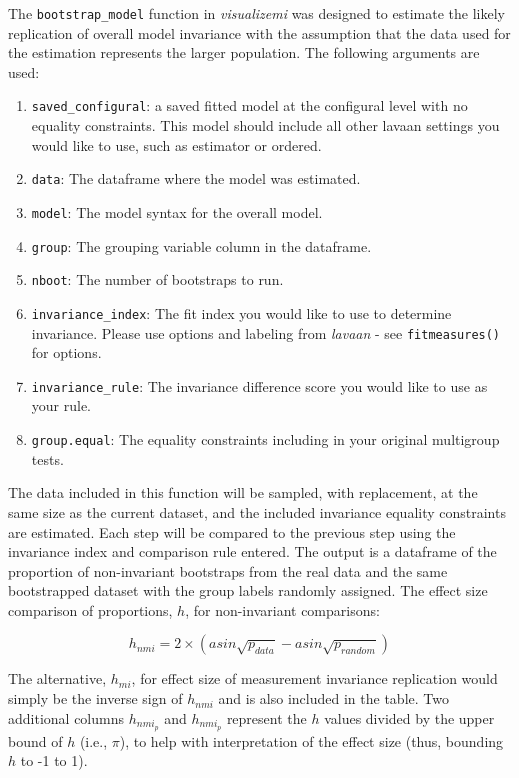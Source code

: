 \documentclass[
  man]{apa7}
\providecommand{\tightlist}{%
  \setlength{\itemsep}{0pt}\setlength{\parskip}{0pt}}
\begin{document}
The \texttt{bootstrap\_model} function in \emph{visualizemi} was designed to estimate the likely replication of overall model invariance with the assumption that the data used for the estimation represents the larger population. The following arguments are used:

\begin{enumerate}
\def\labelenumi{\arabic{enumi})}
\tightlist
\item
  \texttt{saved\_configural}: a saved fitted model at the configural level with no equality constraints. This model should include all other lavaan settings you would like to use, such as estimator or ordered.
\item
  \texttt{data}: The dataframe where the model was estimated.
\item
  \texttt{model}: The model syntax for the overall model.
\item
  \texttt{group}: The grouping variable column in the dataframe.
\item
  \texttt{nboot}: The number of bootstraps to run.
\item
  \texttt{invariance\_index}: The fit index you would like to use to determine invariance. Please use options and labeling from \emph{lavaan} - see \texttt{fitmeasures()} for options.
\item
  \texttt{invariance\_rule}: The invariance difference score you would like to use as your rule.
\item
  \texttt{group.equal}: The equality constraints including in your original multigroup tests.
\end{enumerate}

The data included in this function will be sampled, with replacement, at the same size as the current dataset, and the included invariance equality constraints are estimated. Each step will be compared to the previous step using the invariance index and comparison rule entered. The output is a dataframe of the proportion of non-invariant bootstraps from the real data and the same bootstrapped dataset with the group labels randomly assigned. The effect size comparison of proportions, \(h\), for non-invariant comparisons:

\[h_{nmi} = 2 \times (asin\sqrt{p_{data}} - asin\sqrt{p_{random}})\]

The alternative, \(h_{mi}\), for effect size of measurement invariance replication would simply be the inverse sign of \(h_{nmi}\) and is also included in the table. Two additional columns \(h_{nmi_p}\) and \(h_{nmi_p}\) represent the \(h\) values divided by the upper bound of \(h\) (i.e., \(\pi\)), to help with interpretation of the effect size (thus, bounding \(h\) to -1 to 1).
\end{document}
